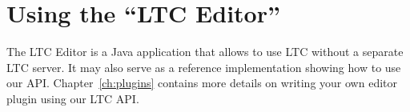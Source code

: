 \section{Using the ``LTC Editor''} \label{sec:java}

The LTC Editor is a Java application that allows to use LTC without a separate LTC server.  It may also serve as a reference implementation showing how to use our API.  Chapter~\ref{ch:plugins} contains more details on writing your own editor plugin using our LTC API.

